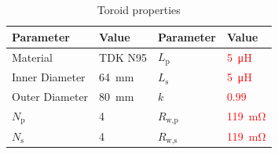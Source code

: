 \documentclass[conference]{IEEEtran}
\begin{document}
\begin{table}
  \centering
  \caption{Toroid properties}
  \begin{tabular}{@{}llll@{}}
    \toprule
    Parameter & Value & Parameter & Value \\ \midrule
    Material & TDK N95 & $L_\text{p}$ & \textcolor{red}{\SI{5}{\micro\henry}} \\
    Inner Diameter & \SI{64}{\milli\meter} & $L_\text{s}$ & \textcolor{red}{\SI{5}{\micro\henry}} \\
    Outer Diameter & \SI{80}{\milli\meter} & $k$ & \textcolor{red}{$0.99$} \\
    $N_\text{p}$ & 4 & $R_\text{w,p}$ & \textcolor{red}{\SI{119}{\milli\ohm}} \\
    $N_\text{s}$ & 4 & $R_\text{w,s}$ & \textcolor{red}{\SI{119}{\milli\ohm}} \\
    \bottomrule
  \end{tabular}
  \label{tab:toroidproperties}
\end{table}
\end{document}
